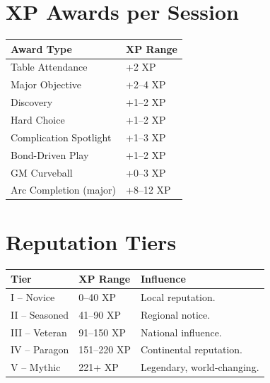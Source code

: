\section*{XP Awards per Session}\label{sec:xp_awards_ref}

\begin{center}
\feTableStart
\begin{longtable}{l l}
\toprule
\textbf{Award Type} & \textbf{XP Range} \\
\midrule
Table Attendance & +2 XP \\
Major Objective & +2--4 XP \\
Discovery & +1--2 XP \\
Hard Choice & +1--2 XP \\
Complication Spotlight & +1--3 XP \\
Bond-Driven Play & +1--2 XP \\
GM Curveball & +0--3 XP \\
Arc Completion (major) & +8--12 XP \\
\bottomrule
\end{longtable}
\end{center}

\section*{Reputation Tiers}\label{sec:reputation_tiers_ref}

\begin{center}
\feTableStart
\begin{longtable}{l l l}
\toprule
\textbf{Tier} & \textbf{XP Range} & \textbf{Influence} \\
\midrule
I -- Novice   & 0--40 XP   & Local reputation. \\
II -- Seasoned & 41--90 XP & Regional notice. \\
III -- Veteran & 91--150 XP & National influence. \\
IV -- Paragon & 151--220 XP & Continental reputation. \\
V -- Mythic   & 221+ XP   & Legendary, world-changing. \\
\bottomrule
\end{longtable}
\end{center}

